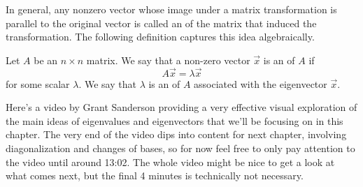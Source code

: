 \documentclass{ximera}
\begin{document}
In general, any nonzero vector whose image under a matrix transformation is parallel to the original vector is called an  of the matrix that induced the transformation.  The following definition captures this idea algebraically.
    
\begin{definition}\label{def:eigen}

Let $A$ be an $n \times n$ matrix.  We say that a non-zero vector $\vec{x}$ is an  of $A$ if $$A\vec{x} = \lambda \vec{x}$$
for some scalar $\lambda$.
We say that $\lambda$ is an  of $A$ associated with the eigenvector $\vec{x}$. 
\end{definition}

Here's a video by Grant Sanderson providing a very effective visual exploration of the main ideas of eigenvalues and eigenvectors that we'll be focusing on in this chapter. The very end of the video dips into content for next chapter, involving diagonalization and changes of bases, so for now feel free to only pay attention to the video until around 13:02. The whole video might be nice to get a look at what comes next, but the final 4 minutes is technically not necessary.

\begin{center}
\end{center}
    
\end{document}
